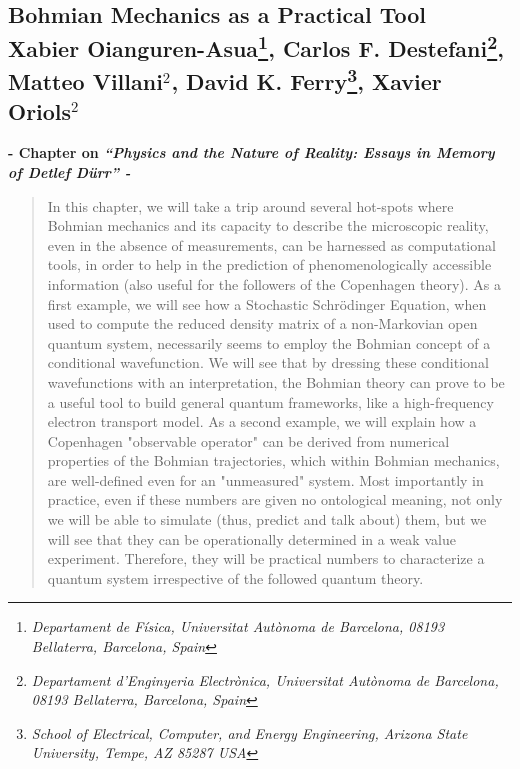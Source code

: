 \documentclass[11pt, a4paper]{article} %
\title{}
\date{\vspace{-11ex}}
\begin{document}
\begin{center}
\section*{ Bohmian Mechanics as a Practical Tool \vspace{0.2cm}\vspace{0.1cm}\\ \small Xabier Oianguren-Asua{\normalsize \footnote{\em Departament de Física, Universitat Autònoma de Barcelona, 08193 Bellaterra, Barcelona, Spain}}, Carlos F. Destefani{\normalsize\footnote{\em Departament d’Enginyeria Electrònica, Universitat Autònoma de Barcelona, 08193 Bellaterra, Barcelona, Spain}}, Matteo Villani{\normalsize$^2$}, David K. Ferry{\normalsize\footnote{\em School of Electrical, Computer, and Energy Engineering, Arizona State University, Tempe,
AZ 85287 USA}}, Xavier Oriols{\normalsize$^2$}}

\vspace{-0.3cm}
{\bf \small - Chapter on {\em “Physics and the Nature of Reality: Essays in Memory of Detlef Dürr” - }}\vspace{-0.32cm}
\end{center}
\vspace{0.2cm}
\begin{abstract}
\vspace{-0.2cm}
\hspace{5mm}In this chapter, we will take a trip around several hot-spots where Bohmian mechanics and its capacity to describe the microscopic reality, even in the absence of measurements, can be harnessed as computational tools, in order to help in the prediction of phenomenologically accessible information (also useful for the followers of the Copenhagen theory). As a first example, we will see how a Stochastic Schrödinger Equation, when used to compute the reduced density matrix of a non-Markovian open quantum system, necessarily seems to employ the Bohmian concept of a conditional wavefunction. We will see that by dressing these conditional wavefunctions with an interpretation, the Bohmian theory can prove to be a useful tool to build general quantum frameworks, like a high-frequency electron transport model. As a second example, we will explain how a Copenhagen "observable operator" can be derived from numerical properties of the Bohmian trajectories, which within Bohmian mechanics, are well-defined even for an "unmeasured" system. Most importantly in practice, even if these numbers are given no ontological meaning, not only we will be able to simulate (thus, predict and talk about) them, but we will see that they can be operationally determined in a weak value experiment. Therefore, they will be practical numbers to characterize a quantum system irrespective of the followed quantum theory.
\end{abstract}
\end{document}

